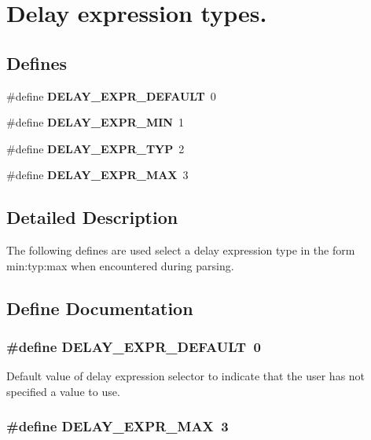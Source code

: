 \section{Delay expression types.}
\label{group__delay__expr__types}
\subsection*{Defines}
\begin{CompactItemize}
\item 
\#define {\bf DELAY\_\-EXPR\_\-DEFAULT}\ 0
\item 
\#define {\bf DELAY\_\-EXPR\_\-MIN}\ 1
\item 
\#define {\bf DELAY\_\-EXPR\_\-TYP}\ 2
\item 
\#define {\bf DELAY\_\-EXPR\_\-MAX}\ 3
\end{CompactItemize}


\subsection{Detailed Description}
The following defines are used select a delay expression type in the form min:typ:max when encountered during parsing. 

\subsection{Define Documentation}
\subsubsection{\setlength{\rightskip}{0pt plus 5cm}\#define DELAY\_\-EXPR\_\-DEFAULT\ 0}\label{group__delay__expr__types_a0}


Default value of delay expression selector to indicate that the user has not specified a value to use. 
\subsubsection{\setlength{\rightskip}{0pt plus 5cm}\#define DELAY\_\-EXPR\_\-MAX\ 3}\label{group__delay__expr__types_a3}


